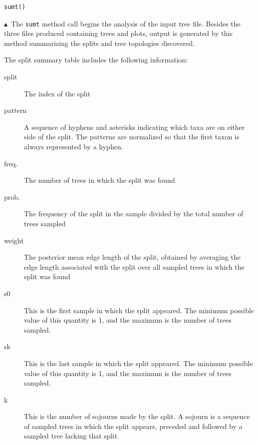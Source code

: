 \documentclass[10pt]{article}
\newcommand{\cmd}[1]{{\tt \small #1}\index{#1}}	%
\newcommand{\pointup}{$\blacktriangle$}
\begin{document}
\begin{samepage}
\begin{verbatim}
sumt()
\end{verbatim}
\pointup\ The \cmd{sumt} method call begins the analysis of the input tree file. Besides the three files produced containing trees and plots, output is generated by this method summarizing the splits and tree topologies discovered.
\end{samepage}
The split summary table includes the following information:
\begin{description}
\item[split] The index of the split
\item[pattern] A sequence of hyphens and asterisks indicating which taxa are on either side of the split. The patterns are normalized so that the first taxon is always represented by a hyphen.
\item[freq.] The number of trees in which the split was found
\item[prob.] The frequency of the split in the sample divided by the total number of trees sampled
\item[weight] The posterior mean edge length of the split, obtained by averaging the edge length associated with the split over all sampled trees in which the split was found
\item[s0] This is the first sample in which the split appeared. The minimum possible value of this quantity is 1, and the maximum is the number of trees sampled.
\item[sk] This is the last sample in which the split appeared. The minimum possible value of this quantity is 1, and the maximum is the number of trees sampled.
\item[k] This is the number of sojourns made by the split. A sojourn is a sequence of sampled trees in which the split appears, preceded and followed by a sampled tree lacking that split.
\end{description}
\end{document}

